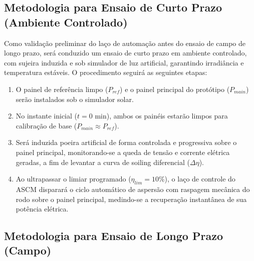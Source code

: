 \documentclass[12pt, a4paper]{article}
\begin{document}
\subsection{Metodologia para Ensaio de Curto Prazo (Ambiente Controlado)}

Como validação preliminar do laço de automação antes do ensaio de campo de longo prazo, será conduzido um ensaio de curto prazo em ambiente controlado, com sujeira induzida e sob simulador de luz artificial, garantindo irradiância e temperatura estáveis. O procedimento seguirá as seguintes etapas:
\begin{enumerate}
    \item O painel de referência limpo ($P_{ref}$) e o painel principal do protótipo ($P_{main}$) serão instalados sob o simulador solar.
    \item No instante inicial ($t=0$ min), ambos os painéis estarão limpos para calibração de base ($P_{main} \approx P_{ref}$).
    \item Será induzida poeira artificial de forma controlada e progressiva sobre o painel principal, monitorando-se a queda de tensão e corrente elétrica geradas, a fim de levantar a curva de soiling diferencial ($\Delta \eta$).
    \item Ao ultrapassar o limiar programado ($\eta_{lim} = 10\%$), o laço de controle do ASCM disparará o ciclo automático de aspersão com raspagem mecânica do rodo sobre o painel principal, medindo-se a recuperação instantânea de sua potência elétrica.
\end{enumerate}

\subsection{Metodologia para Ensaio de Longo Prazo (Campo)}
\end{document}
